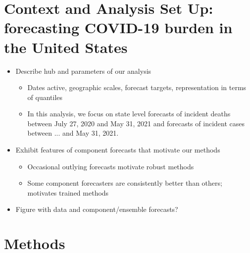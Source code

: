 \documentclass[review]{elsarticle}
\begin{document}
\section{Context and Analysis Set Up: forecasting COVID-19 burden in the United States}

\begin{itemize}
  \item Describe hub and parameters of our analysis
  \begin{itemize}
    \item Dates active, geographic scales, forecast targets, representation in terms of quantiles
    \item In this analysis, we focus on state level forecasts of incident deaths between July 27, 2020 and May 31, 2021 and forecasts of incident cases between ... and May 31, 2021.
  \end{itemize}
  \item Exhibit features of component forecasts that motivate our methods
  \begin{itemize}
    \item Occasional outlying forecasts motivate robust methods
    \item Some component forecasters are consistently better than others; motivates trained methods
  \end{itemize}
  \item Figure with data and component/ensemble forecasts?
\end{itemize}

\section{Methods}
\end{document}
